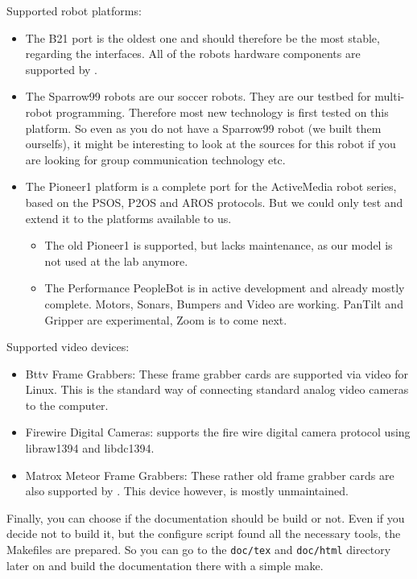\documentclass[10pt]{book}
\begin{document}
Supported robot platforms:
\begin{itemize}
\item The B21 port is the oldest one and should therefore be the most
  stable, regarding the interfaces. All of the robots hardware
  components are supported by \miro.
\item The Sparrow99 robots are our soccer robots. They are our testbed
  for multi-robot programming. Therefore most new technology is first
  tested on this platform. So even as you do not have a Sparrow99
  robot (we built them ourselfs), it might be interesting to look at
  the sources for this robot if you are looking for group
  communication technology etc.
\item The Pioneer1 platform is a complete port for the ActiveMedia
  robot series, based on the PSOS, P2OS and AROS protocols. But we
  could only test and extend it to the platforms available to us.
  \begin{itemize}
  \item The old Pioneer1 is supported, but lacks maintenance, as our
    model is not used at the lab anymore.
  \item The Performance PeopleBot is in active development and already
    mostly complete. Motors, Sonars, Bumpers and Video are working.
    PanTilt and Gripper are experimental, Zoom is to come next.
  \end{itemize}
\end{itemize}

Supported video devices:
\begin{itemize}
\item Bttv Frame Grabbers: These frame grabber cards are supported via
  video for Linux.  This is the standard way of connecting standard
  analog video cameras to the computer.
\item Firewire Digital Cameras: \miro supports the fire wire digital
  camera protocol using libraw1394 and libdc1394.
\item Matrox Meteor Frame Grabbers: These rather old frame grabber
  cards are also supported by \miro. This device however, is mostly
  unmaintained.
\end{itemize}

Finally, you can choose if the documentation should be build or not.
Even if you decide not to build it, but the configure script found all
the necessary tools, the Makefiles are prepared. So you can go to the
\texttt{doc/tex} and \texttt{doc/html} directory later on and build
the documentation there with a simple make.
\end{document}
